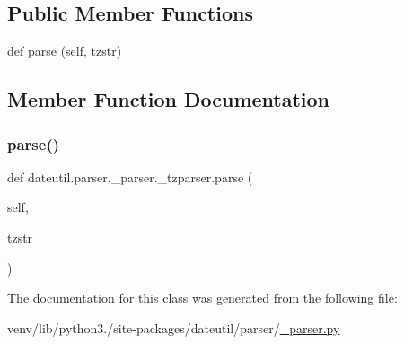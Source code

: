 \subsection*{Public Member Functions}
\begin{DoxyCompactItemize}
\item 
def \hyperlink{classdateutil_1_1parser_1_1__parser_1_1__tzparser_ae49ec727e728e00d61d9d5fdf2e06882}{parse} (self, tzstr)
\end{DoxyCompactItemize}


\subsection{Member Function Documentation}
\mbox{\label{classdateutil_1_1parser_1_1__parser_1_1__tzparser_ae49ec727e728e00d61d9d5fdf2e06882}} 
\subsubsection{\texorpdfstring{parse()}{parse()}}
{\footnotesize\ttfamily def dateutil.\+parser.\+\_\+parser.\+\_\+tzparser.\+parse (\begin{DoxyParamCaption}\item[{}]{self,  }\item[{}]{tzstr }\end{DoxyParamCaption})}



The documentation for this class was generated from the following file\+:\begin{DoxyCompactItemize}
\item 
venv/lib/python3./site-\/packages/dateutil/parser/\hyperlink{dateutil_2parser_2__parser_8py}{\+\_\+parser.\+py}\end{DoxyCompactItemize}
